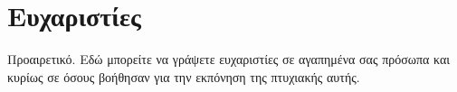 \documentclass[../main.tex]{subfiles}
\begin{document}
\section*{Ευχαριστίες}
Προαιρετικό.
\newline
Εδώ μπορείτε να γράψετε ευχαριστίες σε αγαπημένα σας πρόσωπα και κυρίως σε όσους βοήθησαν για την εκπόνηση της πτυχιακής αυτής.
\clearpage
\end{document}

